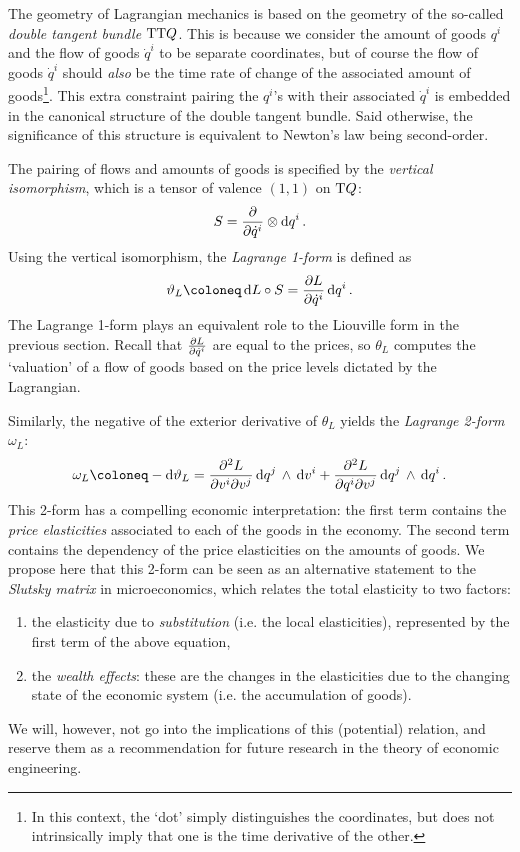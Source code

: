 The geometry of Lagrangian mechanics is based on the geometry of the so-called \emph{double tangent bundle} \(\mathrm{T}\mathrm{T}Q\). This is because we consider the amount of goods \(q^i\) and the flow of goods \(\dot{q}^i\) to be separate coordinates, but of course the flow of goods \(\dot{q}^i\) should \emph{also} be the time rate of change of the associated amount of goods\footnote{In this context, the `dot' simply distinguishes the coordinates, but does not intrinsically imply that one is the time derivative of the other.}. This extra constraint pairing the \(q^i\)'s with their associated \(\dot{q}^i\) is embedded in the canonical structure of the double tangent bundle. Said otherwise, the significance of this structure is equivalent to Newton's law being second-order.

The pairing of flows and amounts of goods is specified by the \emph{vertical isomorphism}, which is a tensor of valence \((1,1)\) on \(\mathrm{T}Q\): \cite{Carinena1990}
\begin{equation}
    S = \pdv{}{\dot{q}^i}\otimes \dd{q^i}.
\end{equation}
Using the vertical isomorphism, the \emph{Lagrange 1-form} is defined as
\begin{equation}
    \theta_L \coloneq \dd{L}\circ S = \pdv{L}{\dot{q}^i}\dd{q^i}.
\end{equation}
The Lagrange 1-form plays an equivalent role to the Liouville form in the previous section. Recall that \(\pdv{L}{\dot{q}^i}\) are equal to the prices, so \(\theta_L\) computes the `valuation' of a flow of goods based on the price levels dictated by the Lagrangian. 

Similarly, the negative of the exterior derivative of \(\theta_L\) yields the \emph{Lagrange 2-form} \(\omega_L\):
\begin{equation}
    \omega_L \coloneq -\dd{\theta_L} = \pdv[2]{L}{v^i}{v^j}\wedgep{\dd{q^j}}{\dd{v^i}} + \pdv[2]{L}{q^i}{v^j}\wedgep{\dd{q^j}}{\dd{q^i}}.
\end{equation}
This 2-form has a compelling economic interpretation: the first term contains the \emph{price elasticities} associated to each of the goods in the economy. The second term contains the dependency of the price elasticities on the amounts of goods.
We propose here that this 2-form can be seen as an alternative statement to the \emph{Slutsky matrix} in microeconomics, which relates the total elasticity to two factors: \cite{varianhalr1992}
\begin{enumerate}[label=(\roman*), noitemsep]
    \item the elasticity due to \emph{substitution} (i.e. the local elasticities), represented by the first term of the above equation, 
    \item the \emph{wealth effects}: these are the changes in the elasticities due to the changing state of the economic system (i.e. the accumulation of goods).
\end{enumerate}
We will, however, not go into the implications of this (potential) relation, and reserve them as a recommendation for future research in the theory of economic engineering.

